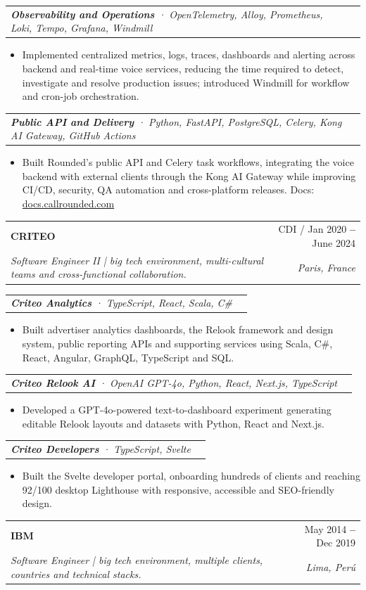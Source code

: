 \documentclass[letterpaper,11pt]{article}
\makeatletter
\newcommand{\resumeItem}[1]{
  \item\small{
    {#1 \vspace{-2pt}}
  }
}
\newcommand{\resumeSubheading}[4]{
  \vspace{-4pt}\item
    \begin{tabular*}{0.97\textwidth}[t]{l@{\extracolsep{\fill}}r}
      \textbf{#1} & \small#2 \\
      \textit{\small#3} & \textit{\small #4} \\
    \end{tabular*}\vspace{-7pt}
}
\newcommand{\resumeSubSubheading}[2]{
    \vspace{-2pt}\item
    \begin{tabular*}{0.97\textwidth}{l@{\extracolsep{\fill}}r}
      \textit{\small#1} & \textit{\small #2} \\
    \end{tabular*}\vspace{-7pt}
}
\newcommand{\resumeItemListStart}{\begin{itemize}}
\newcommand{\resumeItemListEnd}{\end{itemize}\vspace{-5pt}}
\makeatother
\begin{document}
    \resumeSubSubheading{\textbf{Observability and Operations} · OpenTelemetry, Alloy, Prometheus, Loki, Tempo, Grafana, Windmill}{}
      \resumeItemListStart
        \resumeItem{Implemented centralized metrics, logs, traces, dashboards and alerting across backend and real-time voice services, reducing the time required to detect, investigate and resolve production issues; introduced Windmill for workflow and cron-job orchestration.}
      \resumeItemListEnd

    \resumeSubSubheading{\textbf{Public API and Delivery} · Python, FastAPI, PostgreSQL, Celery, Kong AI Gateway, GitHub Actions}{}
      \resumeItemListStart
        \resumeItem{Built Rounded's public API and Celery task workflows, integrating the voice backend with external clients through the Kong AI Gateway while improving CI/CD, security, QA automation and cross-platform releases. Docs: {\href{https://docs.callrounded.com}{\color{blue}docs.callrounded.com}}}
      \resumeItemListEnd

    \vspace{8pt}
    \resumeSubheading
    {CRITEO}{CDI / Jan 2020 \textbf{--} June 2024}
    {Software Engineer II | big tech environment, multi-cultural teams and cross-functional collaboration.}{Paris, France}
    \vspace{8pt}

    \resumeSubSubheading{\textbf{Criteo Analytics} · TypeScript, React, Scala, C\# }{}
      \resumeItemListStart
        \resumeItem{Built advertiser analytics dashboards, the Relook framework and design system, public reporting APIs and supporting services using Scala, C\#, React, Angular, GraphQL, TypeScript and SQL.}
        \resumeItemListEnd

    \resumeSubSubheading{\textbf{Criteo Relook AI} · OpenAI GPT-4o, Python, React, Next.js, TypeScript }{}
      \resumeItemListStart
        \resumeItem{Developed a GPT-4o-powered text-to-dashboard experiment generating editable Relook layouts and datasets with Python, React and Next.js.}
        \resumeItemListEnd

    \resumeSubSubheading{\textbf{Criteo Developers} · TypeScript, Svelte }{}
      \resumeItemListStart
        \resumeItem{Built the Svelte developer portal, onboarding hundreds of clients and reaching 92/100 desktop Lighthouse with responsive, accessible and SEO-friendly design.}
      \resumeItemListEnd

    \vspace{8pt}
    \resumeSubheading
    {IBM}{May 2014 \textbf{--} Dec 2019}
    {Software Engineer | big tech environment, multiple clients, countries and technical stacks.}{Lima, Perú}
    \vspace{8pt}
\end{document}
